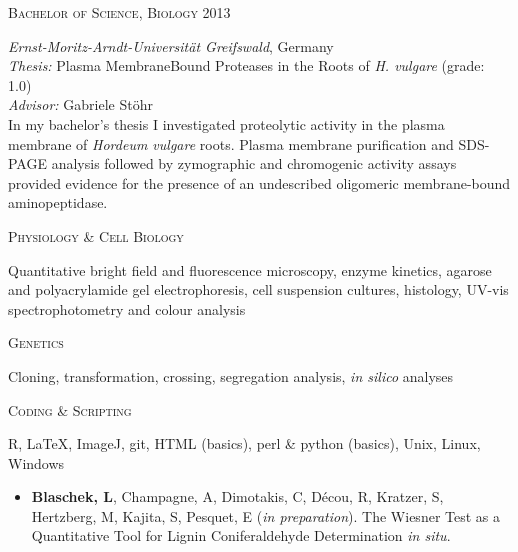 \documentclass[11pt]{article}
\begin{document}
\textsc{\large{Bachelor of Science, Biology}} \hfill \textsc{2013}
\begin{addmargin}[24pt]{0pt}
	\textit{Ernst-Moritz-Arndt-Universität Greifswald}, Germany \\
	\textit{Thesis:} Plasma Membrane\textendash Bound Proteases in the Roots of \textit{H. vulgare} (grade: \textsc{1.0}) \\
	\textit{Advisor:} Gabriele Stöhr
	\vspace{0.1cm} \\
	\small{In my bachelor's thesis I investigated proteolytic activity in the plasma membrane of \textit{Hordeum vulgare} roots. Plasma membrane purification and SDS-PAGE analysis followed by zymographic and chromogenic activity assays provided evidence for the presence of an undescribed oligomeric membrane-bound aminopeptidase.}
\end{addmargin}
\vspace{1cm}

\vspace{0.2cm}

\textsc{\large{Physiology \& Cell Biology}} 
\begin{addmargin}[24pt]{0pt}
	Quantitative bright field and fluorescence microscopy, enzyme kinetics, agarose and polyacrylamide gel electrophoresis, cell suspension cultures, histology, UV-vis spectrophotometry and colour analysis 
\end{addmargin}
\vspace{0.2cm}

\pagebreak

\textsc{\large{Genetics}} 
\begin{addmargin}[24pt]{0pt}
	Cloning, transformation, crossing, segregation analysis, \textit{in silico} analyses
\end{addmargin}	
\vspace{0.2cm}

\textsc{\large{Coding \& Scripting}}
\begin{addmargin}[24pt]{0pt}
	R, LaTeX, ImageJ, git, HTML (basics), perl \& python (basics), Unix, Linux, Windows
\vspace{1cm}
\end{addmargin}

	\begin{itemize}[label={},itemindent=-9pt,leftmargin=24pt]
	\item \textbf{Blaschek, L}, Champagne, A, Dimotakis, C, Décou, R, Kratzer, S, Hertzberg, M, Kajita, S, Pesquet, E (\textit{in preparation}). The Wiesner Test as a Quantitative Tool for Lignin Coniferaldehyde Determination \textit{in situ}.
	\end{itemize}
\vspace{1cm}
\end{document}
